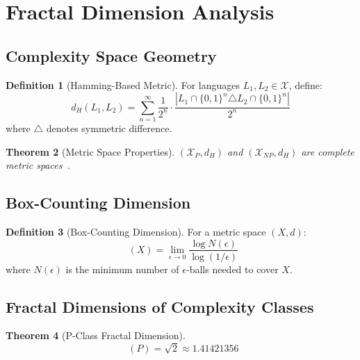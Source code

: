\documentclass[12pt]{article}
\theoremstyle{plain}
\newtheorem{theorem}{Theorem}[section]
\theoremstyle{definition}
\newtheorem{definition}[theorem]{Definition}
\DeclareMathOperator{\dimfrac}{dim_{frac}}
\begin{document}
\section{Fractal Dimension Analysis}

\subsection{Complexity Space Geometry}

\begin{definition}[Hamming-Based Metric]
For languages $L_1, L_2 \in \mathcal{X}$, define:
\begin{equation}
d_H(L_1, L_2) = \sum_{n=1}^{\infty} \frac{1}{2^n} \cdot \frac{|L_1 \cap \{0,1\}^n \triangle L_2 \cap \{0,1\}^n|}{2^n}
\end{equation}
where $\triangle$ denotes symmetric difference.
\end{definition}

\begin{theorem}[Metric Space Properties]
$(\mathcal{X}_P, d_H)$ and $(\mathcal{X}_{NP}, d_H)$ are complete metric spaces~\cite{munkres2000topology}.
\end{theorem}

\subsection{Box-Counting Dimension}

\begin{definition}[Box-Counting Dimension]
For a metric space $(X, d)$:
\begin{equation}
\dimfrac(X) = \lim_{\epsilon \to 0} \frac{\log N(\epsilon)}{\log(1/\epsilon)}
\end{equation}
where $N(\epsilon)$ is the minimum number of $\epsilon$-balls needed to cover $X$.
\end{definition}

\subsection{Fractal Dimensions of Complexity Classes}

\begin{theorem}[P-Class Fractal Dimension]
\label{thm:dim_p}
\begin{equation}
\dimfrac(P) = \sqrt{2} \approx 1.41421356
\end{equation}
\end{theorem}
\end{document}
